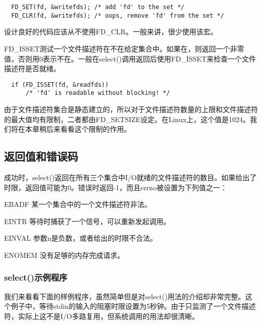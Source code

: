 \begin{lstlisting}
  FD_SET(fd, &writefds); /* add 'fd' to the set */
  FD_CLR(fd, &writefds); /* oops, remove 'fd' from the set */
\end{lstlisting}

设计良好的代码应该从不使用FD\_CLR。一般来讲，很少使用该宏。

FD\_ISSET测试一个文件描述符在不在给定集合中。如果在，则返回一个非零值，否则用0表示不在。一般在select()调用返回后使用FD\_ISSET来检查一个文件描述符是否就绪。 

\begin{lstlisting}
  if (FD_ISSET(fd, &readfds))
      /* 'fd' is readable without blocking! */
\end{lstlisting}

由于文件描述符集合是静态建立的，所以对于文件描述符数量的上限和文件描述符的最大值均有限制，二者都由FD\_SETSIZE设定。在Linux上，这个值是1024。我们将在本章稍后来看看这个限制的作用。 

\subsection{返回值和错误码}

成功时，select()返回在所有三个集合中I/O就绪的文件描述符的数目。如果给出了时限，返回值可能为0。错误时返回-1，而且errno被设置为下列值之一： 

\begin{eqlist*}
\item [EBADF]
某一个集合中的一个文件描述符非法。
\item [EINTR]
等待时捕获了一个信号，可以重新发起调用。
\item [EINVAL]
参数n是负数，或者给出的时限不合法。
\item [ENOMEM]
没有足够的内存完成请求。
\end{eqlist*}

\subsubsection{select()示例程序}

我们来看看下面的样例程序，虽然简单但是对select()用法的介绍却非常完整。这个例子中，等待stdin的输入的阻塞时限设置为5秒钟。由于只监测了一个文件描述符，实际上这不是I/O多路复用，但系统调用的用法却很清晰。 

